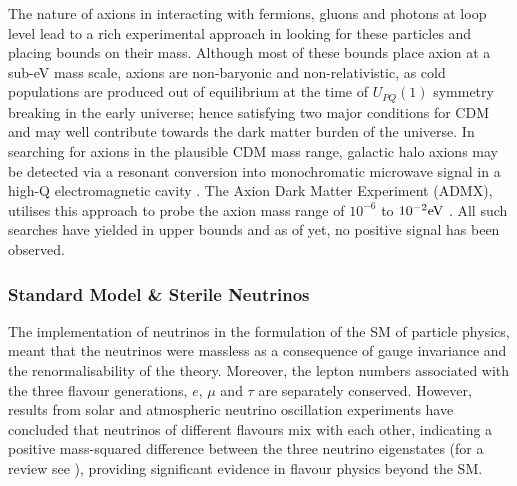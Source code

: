 The nature of axions in interacting with fermions, gluons and photons at loop level lead to a rich experimental approach in looking for these particles and placing bounds on their mass. Although most of these bounds place axion at a sub-eV mass scale, axions are non-baryonic and non-relativistic, as cold populations are produced out of equilibrium at the time of $U_{PQ}(1)$ symmetry breaking in the early universe; hence satisfying two major conditions for CDM and may well contribute towards the dark matter burden of the universe. In searching for axions in the plausible CDM mass range, galactic halo axions may be detected via a resonant conversion into monochromatic microwave signal in a high-Q electromagnetic cavity \cite{axion_searches}. The Axion Dark Matter Experiment (ADMX), utilises this approach to probe the axion mass range of $10^{-6}$ to $10^{-2} \text{eV}$ \cite{ADMX_2010}. All such searches have yielded in upper bounds and as of yet, no positive signal has been observed.


\subsubsection{Standard Model \& Sterile Neutrinos}
\label{subsubsec:neutrinos}

The implementation of neutrinos in the formulation of the SM of particle physics, meant that the neutrinos were massless as a consequence of gauge invariance and the renormalisability of the theory. Moreover, the lepton numbers associated with the three flavour generations, $e$, $\mu$ and $\tau$ are separately conserved. However, results from solar and atmospheric neutrino oscillation experiments have concluded that neutrinos of different flavours mix with each other, indicating a positive mass-squared difference between the three neutrino eigenstates (for a review see \cite{aless2006neutrino}), providing significant evidence in flavour physics beyond the SM.

